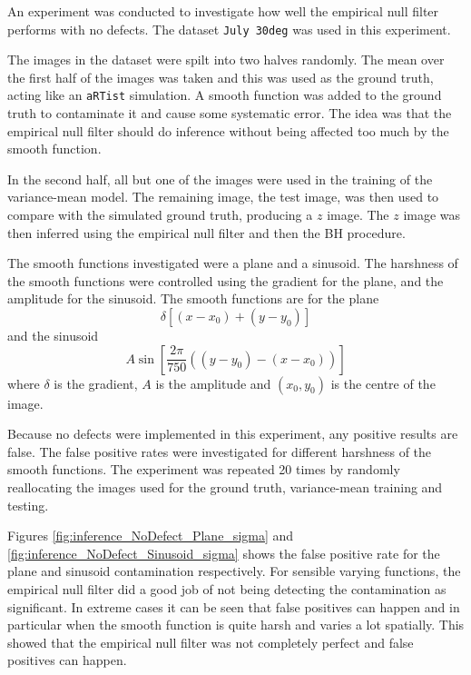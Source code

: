 An experiment was conducted to investigate how well the empirical null filter performs with no defects. The dataset \texttt{July 30deg} was used in this experiment.

The images in the dataset were spilt into two halves randomly. The mean over the first half of the images was taken and this was used as the ground truth, acting like an \texttt{aRTist} simulation. A smooth function was added to the ground truth to contaminate it and cause some systematic error. The idea was that the empirical null filter should do inference without being affected too much by the smooth function.

In the second half, all but one of the images were used in the training of the variance-mean model. The remaining image, the test image, was then used to compare with the simulated ground truth, producing a $z$ image. The $z$ image was then inferred using the empirical null filter and then the BH procedure.

The smooth functions investigated were a plane and a sinusoid. The harshness of the smooth functions were controlled using the gradient for the plane, and the amplitude for the sinusoid. The smooth functions are for the plane
\begin{equation}
	\delta\left[
		(x-x_0)+(y-y_0)
	\right]
\end{equation}
and the sinusoid
\begin{equation}
	A\sin\left[
		\dfrac{
			2\pi
		}
		{
			750
		}
		\left(
			(y-y_0)-(x-x_0)
		\right)
	\right]
\end{equation}
where $\delta$ is the gradient, $A$ is the amplitude and $(x_0,y_0)$ is the centre of the image.

Because no defects were implemented in this experiment, any positive results are false. The false positive rates were investigated for different harshness of the smooth functions. The experiment was repeated 20 times by randomly reallocating the images used for the ground truth, variance-mean training and testing.

Figures \ref{fig:inference_NoDefect_Plane_sigma} and \ref{fig:inference_NoDefect_Sinusoid_sigma} shows the false positive rate for the plane and sinusoid contamination respectively. For sensible varying functions, the empirical null filter did a good job of not being detecting the contamination as significant. In extreme cases it can be seen that false positives can happen and in particular when the smooth function is quite harsh and varies a lot spatially. This showed that the empirical null filter was not completely perfect and false positives can happen.


